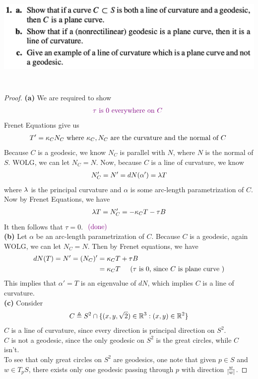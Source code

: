 \documentclass{report}
\begin{document}
\begin{question}{}{}
\includegraphics[height=5cm,width=18cm]{hw71}
\end{question}
\begin{proof}
\textbf{(a)} We are required to show 
\begin{align*}
  \textcolor{violet}{\tau\text{ is }0\text{ everywhere on $C$ }}
\end{align*}
Frenet Equations give us 
\begin{align*}
T'=\kappa_C N_C\text{ where $ \kappa_C,N_C$ are the curvature and the normal of $C$ }
\end{align*}
Because $C$ is a geodesic, we know  $N_C$ is parallel with  $N$, where  $N$ is the normal of  $S$. WOLG, we can let $N_C=N$. Now, because $C$ is a line of curvature, we know  
 \begin{align*}
N_C'=N'= dN(\alpha ')=\lambda  T
\end{align*}
where $\lambda $ is the principal curvature and $\alpha $ is some arc-length parametrization of $C$.\\

Now by Frenet Equations, we have 
\begin{align*}
\lambda T=N_C'=-\kappa_C T- \tau B 
\end{align*}
It then follows that $\tau=0$. $\textcolor{violet}{\text{ (done) }}$\\

\textbf{(b)} Let $\alpha $ be an arc-length parametrization of $C$. Because  $C$ is a geodesic, again WOLG, we can let $N_C=N$. Then by Frenet equations, we have 
\begin{align*}
dN(T)=N'=(N_C)'&= \kappa_C T+ \tau B\\
&=\kappa_C T\hspace{0.5cm}(\tau\text{ is 0, since $C$ is plane curve })
\end{align*}
This implies that $\alpha '=T$ is an eigenvalue of $dN$, which implies  $C$ is a line of curvature. \\

\textbf{(c)} Consider 
\begin{align*}
C\triangleq S^2\cap \{ (x,y,\sqrt{2})\in\mathbb{R}^3: (x,y)\in\mathbb{R}^2 \} 
\end{align*}
$C$ is a line of curvature, since every direction is principal direction on $S^2$.\\

 $C$ is not a geodesic, since the only geodesic on $S^2$ is the great circles, while  $C$ isn't.\\

To see that only great circles on $S^2$ are geodesics, one note that given  $p\in S$ and $w\in T_pS$, there exists only one geodesic passing through $p$ with direction $\frac{w}{\left|w\right|}$.
\end{proof}
\end{document}
